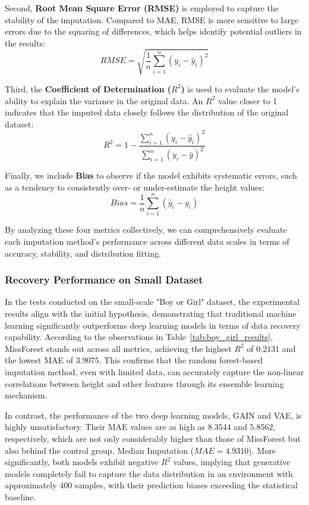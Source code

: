 \documentclass[twocolumn, 9pt]{extarticle}
\begin{document}
Second, \textbf{Root Mean Square Error (RMSE)} is employed to capture the stability of the imputation. Compared to MAE, RMSE is more sensitive to large errors due to the squaring of differences, which helps identify potential outliers in the results:
\begin{equation}
RMSE = \sqrt{\frac{1}{n} \sum_{i=1}^{n} (y_i - \hat{y}_i)^2}
\end{equation}

Third, the \textbf{Coefficient of Determination ($R^2$)} is used to evaluate the model's ability to explain the variance in the original data. An $R^2$ value closer to 1 indicates that the imputed data closely follows the distribution of the original dataset:
\begin{equation}
R^2 = 1 - \frac{\sum_{i=1}^{n} (y_i - \hat{y}_i)^2}{\sum_{i=1}^{n} (y_i - \bar{y})^2}
\end{equation}

Finally, we include \textbf{Bias} to observe if the model exhibits systematic errors, such as a tendency to consistently over- or under-estimate the height values:
\begin{equation}
Bias = \frac{1}{n} \sum_{i=1}^{n} (\hat{y}_i - y_i)
\end{equation}

By analyzing these four metrics collectively, we can comprehensively evaluate each imputation method's performance across different data scales in terms of accuracy, stability, and distribution fitting.

\subsubsection{Recovery Performance on Small Dataset}

In the tests conducted on the small-scale "Boy or Girl" dataset, the experimental results align with the initial hypothesis, demonstrating that traditional machine learning significantly outperforms deep learning models in terms of data recovery capability. According to the observations in Table~\ref{tab:boy_girl_results}, MissForest stands out across all metrics, achieving the highest $R^2$ of $0.2131$ and the lowest MAE of $3.9075$. This confirms that the random forest-based imputation method, even with limited data, can accurately capture the non-linear correlations between height and other features through its ensemble learning mechanism.

In contrast, the performance of the two deep learning models, GAIN and VAE, is highly unsatisfactory. Their MAE values are as high as $8.3544$ and $5.8562$, respectively, which are not only considerably higher than those of MissForest but also behind the control group, Median Imputation ($MAE=4.9310$). More significantly, both models exhibit negative $R^2$ values, implying that generative models completely fail to capture the data distribution in an environment with approximately 400 samples, with their prediction biases exceeding the statistical baseline.
\end{document}
